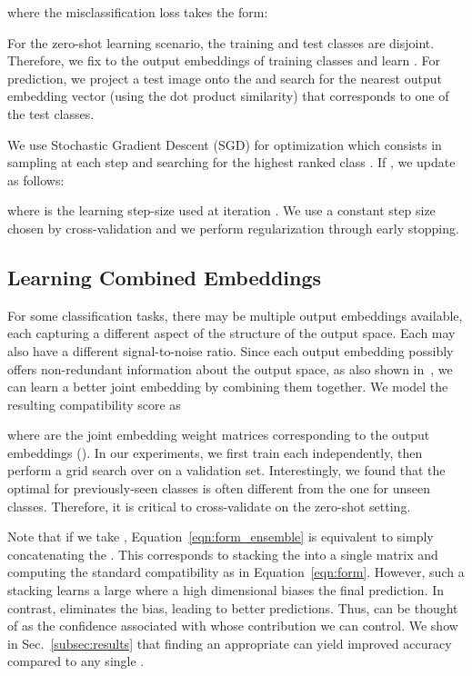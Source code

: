 \documentclass[10pt,twocolumn,letterpaper]{article}
\begin{document}
where the misclassification loss  takes the form:

For the zero-shot learning scenario, the training and test classes are disjoint. Therefore, we fix  to the output embeddings of training classes and learn . For prediction, we project a test image onto the  and search for the nearest output embedding vector (using the dot product similarity) that corresponds to one of the test classes.

We use Stochastic Gradient Descent (SGD) for optimization which consists in sampling  at each step and searching for the highest ranked class . If , we update  as follows: 

where  is the learning step-size used at iteration . We use a constant step size chosen by cross-validation and we perform regularization through early stopping.

\subsection{Learning Combined Embeddings}
\label{subsec:comb_emb}
For some classification tasks, there may be multiple output embeddings available, each capturing a different aspect of the structure of the output space. Each may also have a different signal-to-noise ratio. Since each output embedding possibly offers non-redundant information about the output space, as also shown in~\cite{RSS11,APHS15}, we can learn a better joint embedding by combining them together. We model the resulting compatibility score as

where  are the joint embedding weight matrices corresponding to the  output embeddings (). In our experiments, we first train each  independently, then perform a grid search over  on a validation set. Interestingly, we found that the optimal  for previously-seen classes is often different from the one for unseen classes. Therefore, it is critical to cross-validate  on the zero-shot setting.

Note that if we take , Equation~\ref{eqn:form_ensemble} is equivalent to simply concatenating the . This corresponds to stacking the  into a single matrix  and computing the standard compatibility as in Equation~\ref{eqn:form}. However, such a stacking learns a large  where a high dimensional  biases the final prediction. In contrast,  eliminates the bias, leading to better predictions. 
Thus,  can be thought of as the confidence associated with  whose contribution we can control. We show in Sec.~\ref{subsec:results} that finding an appropriate  can yield improved accuracy compared to any single .
\end{document}
